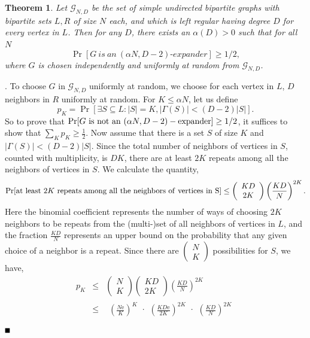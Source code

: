 \documentclass{article}
\newtheorem{theorem}{Theorem}[section]
\newcommand{\bproof}{\noindent{\bf Proof}}
\newcommand{\eproof}{\hspace*{\fill}$\rule{2mm}{2mm}$~~~~\bigskip}
\renewenvironment{proof}{\bproof. }{\eproof}
\begin{document}
\begin{theorem}\label{bipartiteexpanderexists}
Let $\mathcal{G}_{N,D}$ be the set of simple undirected bipartite graphs with bipartite sets $L, R$ of size $N$ each, and which is left regular having degree $D$ for every vertex in $L$. Then for any $D$, there exists an $\alpha(D)>0$ such that for all $N$
\[
\Pr [G{~is~an~}(\alpha N,D-2){\textrm{-}expander}]\geq1/2,
\]
where $G$ is chosen independently and uniformly at random from $\mathcal{G}_{N,D}$.
\end{theorem}
\begin{proof}
To choose $G$ in $\mathcal{G}_{N,D}$ uniformly at random, we choose for each vertex in $L$, $D$ neighbors in $R$ uniformly at random. For $K\leq\alpha N$, let us define
\[
p_K=\Pr[\exists S\subseteq L:|S|=K,|\Gamma(S)|<(D-2)|S|].
\]
So to prove that $\Pr [G{\rm ~is~not~an~(}\alpha N,D-2{\rm )-expander]}\geq 1/2$, it suffices to show that $\sum_Kp_K\geq\frac{1}{2}$. Now assume that there is a set $S$ of size $K$ and $|\Gamma (S)|<(D-2)|S|$. Since the total number of neighbors of vertices in $S$, counted with multiplicity, is $DK$, there are at least $2K$ repeats among all the neighbors of vertices in $S$. We calculate the quantity,
\[
\Pr[{\rm at~least}~2K~{\rm repeats~among~all~the~neighbors~of~vertices~in~}\mathrm{S}]\leq\left( \begin{array}{c}KD\\ 2K\end{array}\right)\left(\frac{KD}{N}\right)^{2K}.
\]
Here the binomial coefficient represents the number of ways of choosing $2K$ neighbors to be repeats from the (multi-)set of all neighbors of vertices in $L$, and the fraction $\frac{KD}{N}$ represents an upper bound on the probability that any given choice of a neighbor is a repeat. Since there are $\left(\begin{array}{c}N\\K\end{array}\right)$ possibilities for $S$, we have,
\begin{eqnarray*}
p_K&\leq&\left(\begin{array}{c}N\\K\end{array}\right)\left( \begin{array}{c}KD\\ 2K\end{array}\right)\left(\frac{KD}{N}\right)^{2K}\\
&\leq&\begin{array}{c}\left(\frac{N\mathrm{e}}{K}\right)^K\end{array}\cdot\begin{array}{c}\left(\frac{KD\mathrm{e}}{2K}\right)^{2K}\end{array}\cdot\begin{array}{c}\left(\frac{KD}{N}\right)^{2K}\end{array}\\

\end{eqnarray*}
\end{proof}
\end{document}
